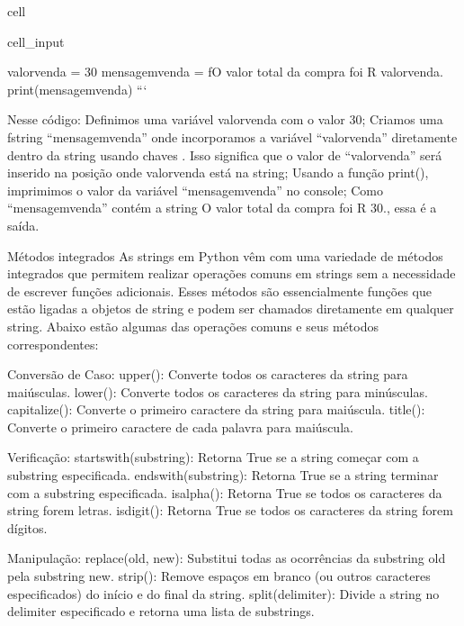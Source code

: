 \documentclass[letterpaper,10pt,english]{jupyterBook}
\begin{document}
\begin{sphinxuseclass}{cell}\begin{sphinxVerbatimInput}

\begin{sphinxuseclass}{cell_input}
\begin{sphinxVerbatim}[commandchars=\\\{\}]
valor\PYGZus{}venda = 30
mensagem\PYGZus{}venda = f\PYGZsq{}O valor total da compra foi R\PYGZdl{} \PYGZob{}valor\PYGZus{}venda\PYGZcb{}.\PYGZsq{}
print(mensagem\PYGZus{}venda)  ```


Nesse código:
Definimos uma variável valor\PYGZus{}venda com o valor 30;
Criamos uma f\PYGZhy{}string “mensagem\PYGZus{}venda” onde incorporamos a variável “valor\PYGZus{}venda” diretamente dentro da string usando chaves \PYGZob{}\PYGZcb{}. Isso significa que o valor de “valor\PYGZus{}venda” será inserido na posição onde \PYGZob{}valor\PYGZus{}venda\PYGZcb{} está na string;
Usando a função print(), imprimimos o valor da variável “mensagem\PYGZus{}venda” no console;
Como “mensagem\PYGZus{}venda” contém a string \PYGZdq{}O valor total da compra foi R\PYGZdl{} 30.\PYGZdq{}, essa é a saída.

Métodos integrados
As strings em Python vêm com uma variedade de métodos integrados que permitem realizar operações comuns em strings sem a necessidade de escrever funções adicionais. Esses métodos são essencialmente funções que estão \PYGZdq{}ligadas\PYGZdq{} a objetos de string e podem ser chamados diretamente em qualquer string. Abaixo estão algumas das operações comuns e seus métodos correspondentes:

Conversão de Caso:
upper(): Converte todos os caracteres da string para maiúsculas.
lower(): Converte todos os caracteres da string para minúsculas.
capitalize(): Converte o primeiro caractere da string para maiúscula.
title(): Converte o primeiro caractere de cada palavra para maiúscula.
   
Verificação:
startswith(substring): Retorna True se a string começar com a substring especificada.
endswith(substring): Retorna True se a string terminar com a substring especificada.
isalpha(): Retorna True se todos os caracteres da string forem letras.
isdigit(): Retorna True se todos os caracteres da string forem dígitos.

Manipulação:
replace(old, new): Substitui todas as ocorrências da substring old pela substring new.
strip(): Remove espaços em branco (ou outros caracteres especificados) do início e do final da string.
split(delimiter): Divide a string no delimiter especificado e retorna uma lista de substrings.


\end{sphinxVerbatim}
\end{sphinxuseclass}
\end{sphinxVerbatimInput}
\end{sphinxuseclass}
\end{document}
